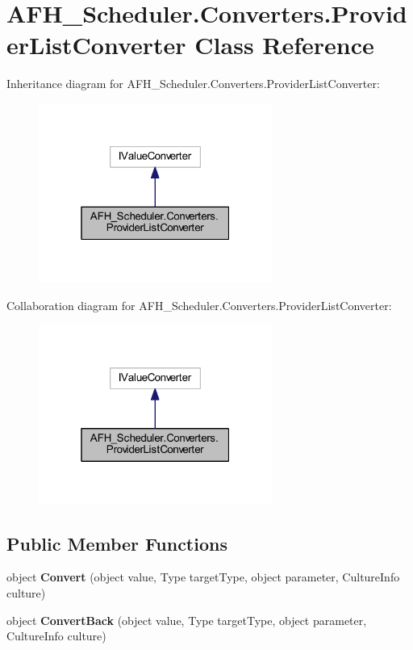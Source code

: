 \section{A\+F\+H\+\_\+\+Scheduler.\+Converters.\+Provider\+List\+Converter Class Reference}
\label{class_a_f_h___scheduler_1_1_converters_1_1_provider_list_converter}


Inheritance diagram for A\+F\+H\+\_\+\+Scheduler.\+Converters.\+Provider\+List\+Converter\+:
\nopagebreak
\begin{figure}[H]
\begin{center}
\leavevmode
\includegraphics[width=217pt]{class_a_f_h___scheduler_1_1_converters_1_1_provider_list_converter__inherit__graph}
\end{center}
\end{figure}


Collaboration diagram for A\+F\+H\+\_\+\+Scheduler.\+Converters.\+Provider\+List\+Converter\+:
\nopagebreak
\begin{figure}[H]
\begin{center}
\leavevmode
\includegraphics[width=217pt]{class_a_f_h___scheduler_1_1_converters_1_1_provider_list_converter__coll__graph}
\end{center}
\end{figure}
\subsection*{Public Member Functions}
\begin{DoxyCompactItemize}
\item 
object \textbf{ Convert} (object value, Type target\+Type, object parameter, Culture\+Info culture)
\item 
object \textbf{ Convert\+Back} (object value, Type target\+Type, object parameter, Culture\+Info culture)
\end{DoxyCompactItemize}


